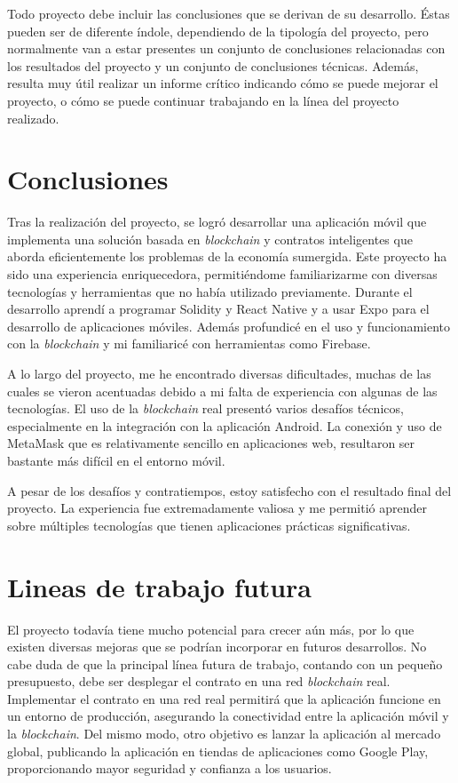 
Todo proyecto debe incluir las conclusiones que se derivan de su desarrollo. Éstas pueden ser de diferente índole, dependiendo de la tipología del proyecto, pero normalmente van a estar presentes un conjunto de conclusiones relacionadas con los resultados del proyecto y un conjunto de conclusiones técnicas. 
Además, resulta muy útil realizar un informe crítico indicando cómo se puede mejorar el proyecto, o cómo se puede continuar trabajando en la línea del proyecto realizado. 


\section{Conclusiones}

Tras la realización del proyecto, se logró desarrollar una aplicación móvil que implementa una solución basada en \textit{blockchain} y contratos inteligentes que aborda eficientemente los problemas de la economía sumergida.
Este proyecto ha sido una experiencia enriquecedora, permitiéndome familiarizarme con diversas tecnologías y herramientas que no había utilizado previamente.
Durante el desarrollo aprendí a programar Solidity y React Native y a usar Expo para el desarrollo de aplicaciones móviles. Además profundicé en el uso y funcionamiento con la \textit{blockchain} y mi familiaricé con herramientas como Firebase.

A lo largo del proyecto, me he encontrado diversas dificultades, muchas de las cuales se vieron acentuadas debido a mi falta de experiencia con algunas de las tecnologías. El uso de la \textit{blockchain} real presentó varios desafíos técnicos, especialmente en la integración con la aplicación Android. La conexión y uso de MetaMask que es relativamente sencillo en aplicaciones web, resultaron ser bastante más difícil en el entorno móvil.

A pesar de los desafíos y contratiempos, estoy satisfecho con el resultado final del proyecto. La experiencia fue extremadamente valiosa y me permitió aprender sobre múltiples tecnologías que tienen aplicaciones prácticas significativas.

\section{Lineas de trabajo futura}

El proyecto todavía tiene mucho potencial para crecer aún más, por lo que existen diversas mejoras que se podrían incorporar en futuros desarrollos. No cabe duda de que la principal línea futura de trabajo, contando con un pequeño presupuesto, debe ser desplegar el contrato en una red \textit{blockchain} real.
Implementar el contrato en una red real permitirá que la aplicación funcione en un entorno de producción, asegurando la conectividad entre la aplicación móvil y la \textit{blockchain}.
Del mismo modo, otro objetivo es lanzar la aplicación al mercado global, publicando la aplicación en tiendas de aplicaciones como Google Play, proporcionando mayor seguridad y confianza a los usuarios.

